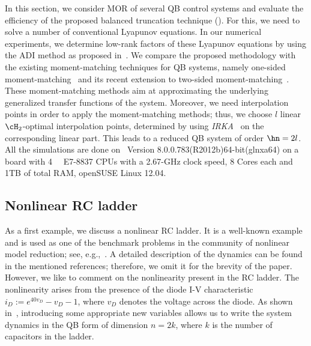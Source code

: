 \def\redQBbal {\ensuremath{{\mathsf{RedQBbal}}}}
\def\redBbal {\ensuremath{{\mathsf{RedBbal}}}}

\def\GramQB {\ensuremath{{\mathsf{TGramQB}}}}
\def\GramB {\ensuremath{{\mathsf{TGramB}}}}

%
%


In this section, we consider MOR of several QB control systems and evaluate the efficiency of the proposed balanced truncation technique (). For this, we need to solve a number of conventional  Lyapunov equations. In our numerical experiments, we determine low-rank factors of these Lyapunov equations by using the ADI method as proposed in~\cite{benner2014self}. We compare the proposed methodology with the existing moment-matching techniques for QB systems, namely one-sided moment-matching~\cite{morGu09} and  its recent extension to two-sided moment-matching~\cite{morBenB15}. These moment-matching methods aim at approximating the underlying generalized transfer functions of the system. Moreover, we need interpolation points in order to apply the moment-matching methods; thus, we choose $l$ linear $\cH_2$-optimal interpolation points, determined by using \emph{IRKA}~\cite{morGugAB08} on the corresponding linear part. This leads to a reduced QB system of order $\hn = 2l$.  All the
simulations are done on
\matlab~Version 8.0.0.783(R2012b)64-bit(glnxa64) on a board with 4 \intel ~\xeon ~E7-8837 CPUs with a 2.67-GHz clock speed, 8 Cores each and 1TB of total RAM, openSUSE Linux 12.04.


\subsection{Nonlinear RC ladder}
As a first example, we discuss a nonlinear RC ladder. It is a well-known example and is used as one of the benchmark problems in the community of nonlinear model reduction; see, e.g.,~\cite{bai2002krylov,morBreD10,morGu09,li2005compact,morPhi03}.  A detailed description of the dynamics can be found in the mentioned references; therefore, we omit it for the brevity of the paper.  However, we like to comment on the nonlinearity present in the RC ladder. The nonlinearity arises from the presence of the diode I-V characteristic $i_D := e^{40v_D}{-} v_D {-}1$, where $v_D$ denotes the voltage across the diode. As shown in~\cite{morGu09},  introducing some appropriate new variables allows us to write the system dynamics in the QB form of dimension $n = 2 k$, where $k$ is the number of capacitors in the ladder.

